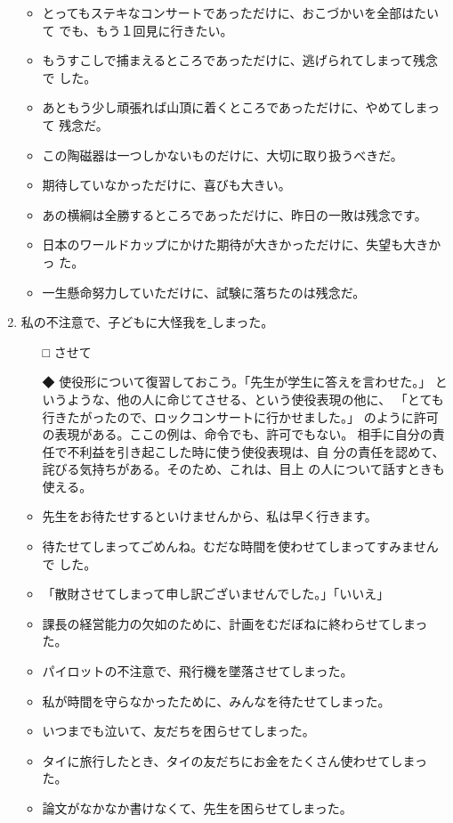 \documentclass[
uplatex,
b5paper,
10pt,
dvipdfmx
]{jsbook}
\begin{document}
\begin{enumerate}
\begin{itemize}
\item とってもステキなコンサートであっただけに、おこづかいを全部はたいて
      でも、もう１回見に行きたい。
\item もうすこしで捕まえるところであっただけに、逃げられてしまって残念で
      した。
\item あともう少し頑張れば山頂に着くところであっただけに、やめてしまって
      残念だ。
\item この陶磁器は一つしかないものだけに、大切に取り扱うべきだ。
\item 期待していなかっただけに、喜びも大きい。
\item あの横綱は全勝するところであっただけに、昨日の一敗は残念です。
\item 日本のワールドカップにかけた期待が大きかっただけに、失望も大きかっ
      た。
\item 一生懸命努力していただけに、試験に落ちたのは残念だ。
\end{itemize}

\item 私の不注意で、子どもに大怪我を\underline{    }しまった。
\begin{itemize}
 \item[□] させて
 \item[◆] 使役形について復習しておこう。「先生が学生に答えを言わせた。」
	   というような、他の人に命じてさせる、という使役表現の他に、
	   「とても行きたがったので、ロックコンサートに行かせました。」
	   のように許可の表現がある。ここの例は、命令でも、許可でもない。
	   相手に自分の責任で不利益を引き起こした時に使う使役表現は、自
	   分の責任を認めて、詫びる気持ちがある。そのため、これは、目上
	   の人について話すときも使える。
\end{itemize}

\begin{itemize}
\item 先生をお待たせするといけませんから、私は早く行きます。
\item 待たせてしまってごめんね。むだな時間を使わせてしまってすみませんで
      した。
\item 「散財させてしまって申し訳ございませんでした。」「いいえ」
\item 課長の経営能力の欠如のために、計画をむだぼねに終わらせてしまった。
\item パイロットの不注意で、飛行機を墜落させてしまった。
\item 私が時間を守らなかったために、みんなを待たせてしまった。
\item いつまでも泣いて、友だちを困らせてしまった。
\item タイに旅行したとき、タイの友だちにお金をたくさん使わせてしまった。
\item 論文がなかなか書けなくて、先生を困らせてしまった。
\end{itemize}


\end{enumerate}
\end{document}
